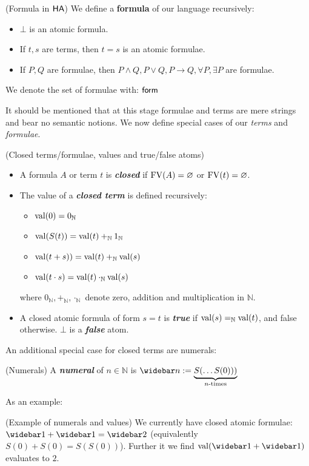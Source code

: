 \begin{cthdefinition}{(Formula in $\textsf{HA}$)}
    We define a \textbf{formula} of our language recursively:
    \begin{itemize}[noitemsep]
        \item $\bot$ is an atomic formula.
        \item If $t,s$ are terms, then $t=s$ is an atomic formulae.
        \item If $P,Q$ are formulae, then $P \land Q, P \lor Q, P \to Q, \forall P, \exists P$ are formulae.
    \end{itemize}
    We denote the set of formulae with: $\textsf{form}$
\end{cthdefinition}
It should be mentioned that at this stage formulae and terms are mere strings and bear no semantic notions. We now define special cases of our \emph{terms} and \emph{formulae}.
\begin{cthdefinition}{(Closed terms/formulae, values and true/false atoms)}
  \begin{itemize}[noitemsep]  
        \item A formula $A$ or term $t$ is \textbf{\emph{closed}} if $\operatorname{FV}(A) = \varnothing$ or $\operatorname{FV}(t) = \varnothing$.
        \item The value of a \textbf{\emph{closed term}} is defined recursively:
        \begin{itemize}
            \item $\operatorname{val}(0) = 0_\mathbb{N}$
            \item $\operatorname{val}(S(t)) = \operatorname{val}(t) +_\mathbb{N} 1_\mathbb{N}$
            \item $\operatorname{val}(t + s)) = \operatorname{val}(t) +_\mathbb{N} \operatorname{val}(s)$
            \item $\operatorname{val}(t \cdot s) = \operatorname{val}(t) \cdot_\mathbb{N} \operatorname{val}(s)$
        \end{itemize}
        where $0_\mathbb{N},+_\mathbb{N},\cdot_\mathbb{N}$ denote zero, addition and multiplication in $\mathbb{N}$.
        \item A closed atomic formula of form $s = t$ is \textbf{\emph{true}} if $\operatorname{val}(s)=_\mathbb{N}\operatorname{val}(t)$, and false otherwise. $\bot$ is a \textbf{\emph{false}} atom.
    \end{itemize}
\end{cthdefinition}
An additional special case for closed terms are numerals:
\begin{cthdefinition}{(Numerals)}
A \textbf{\emph{numeral}} of $n \in \mathbb{N}$ is $\nmrl{n} := \underbrace{S(\dots S(0)))}_{\text{$n$-times}}$
\end{cthdefinition}
As an example:
\begin{cthexample}{(Example of numerals and values)}
  We currently have closed atomic formulae: $\nmrl{1} + \nmrl{1} = \nmrl{2}$ (equivalently $S(0) + S(0) = S(S(0))$).
  Further it we find $\val(\nmrl{1}+\nmrl{1})$ evaluates to $2$.
\end{cthexample}

